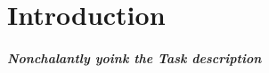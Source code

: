 \documentclass[main.tex]{subfiles}
\begin{document}
\chapter{Introduction}

\paragraph*{Nonchalantly yoink the Task description}
\end{document}
